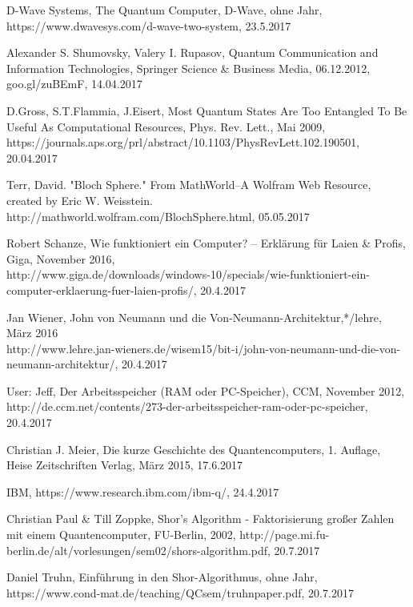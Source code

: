 \documentclass[12pt]{report}
\begin{document}
\begin{thebibliography}{9}
D-Wave Systems, The Quantum Computer, D-Wave, ohne Jahr, https://www.dwavesys.com/d-wave-two-system, 23.5.2017



Alexander S. Shumovsky, Valery I. Rupasov, Quantum Communication and Information Technologies, Springer Science \& Business Media, 06.12.2012,
\\goo.gl/zuBEmF, 14.04.2017

D.Gross, S.T.Flammia, J.Eisert, Most Quantum States Are Too Entangled To Be Useful As Computational Resources, Phys. Rev. Lett., Mai 2009,
\\https://journals.aps.org/prl/abstract/10.1103/PhysRevLett.102.190501, 20.04.2017


Terr, David. "Bloch Sphere." From MathWorld--A Wolfram Web Resource, created by Eric W. Weisstein.
\\http://mathworld.wolfram.com/BlochSphere.html, 05.05.2017




Robert Schanze, Wie funktioniert ein Computer? – Erklärung für Laien \& Profis, Giga, November 2016, \\http://www.giga.de/downloads/windows-10/specials/wie-funktioniert-ein-computer-erklaerung-fuer-laien-profis/, 20.4.2017

Jan Wiener, John von Neumann und die Von-Neumann-Architektur,*/lehre, März 2016 \\http://www.lehre.jan-wieners.de/wisem15/bit-i/john-von-neumann-und-die-von-neumann-architektur/, 20.4.2017

User: Jeff, Der Arbeitsspeicher (RAM oder PC-Speicher), CCM, November 2012, http://de.ccm.net/contents/273-der-arbeitsspeicher-ram-oder-pc-speicher, 20.4.2017

Christian J. Meier, Die kurze Geschichte des Quantencomputers, 1. Auflage, Heise Zeitschriften Verlag, März 2015, 17.6.2017

IBM, https://www.research.ibm.com/ibm-q/, 24.4.2017

Christian Paul \& Till Zoppke, Shor's Algorithm - Faktorisierung großer Zahlen mit einem Quantencomputer, FU-Berlin, 2002, http://page.mi.fu-berlin.de/alt/vorlesungen/sem02/shors-algorithm.pdf, 20.7.2017

Daniel Truhn, Einführung in den Shor-Algorithmus, ohne Jahr, https://www.cond-mat.de/teaching/QCsem/truhnpaper.pdf, 20.7.2017


\end{thebibliography}
\end{document}
